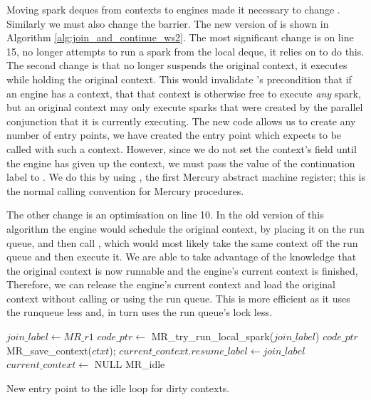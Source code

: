 Moving spark deques from contexts to engines made it necessary to change
\idle.
Similarly we must also change the \joinandcontinue barrier.
The new version of \joinandcontinue is shown in Algorithm
\ref{alg:join_and_continue_ws2}.
The most significant change is on line 15,
\joinandcontinue no longer attempts to run a spark from the local deque,
it relies on \idle to do this.
The second change is that \joinandcontinue no longer suspends the original
context, it executes \idle while holding the original context.
This would invalidate \idle's precondition that if an engine has a context,
that that context is otherwise free to execute \emph{any} spark,
but an original context may only execute sparks that were created by the
parallel conjunction that it is currently executing.
The new \idle code allows us to create any number of entry points,
we have created the \idleorigcontext entry point which expects to be called
with such a context.
However, since we do not set the context's  field until
the engine has given up the context,
we must pass the value of the continuation label to \idleorigcontext.
We do this by using , the first Mercury abstract machine
register;
this is the normal calling convention for Mercury procedures.

The other change is an optimisation on line 10.
In the old version of this algorithm the engine would schedule the original
context,
by placing it on the run queue,
and then call \idle,
which would most likely take the same context off the run queue and then
execute it.
We are able to take advantage of the knowledge that the original context is
now runnable and the engine's current context is finished,
Therefore, we can release the engine's current context and load the original
context without calling \idle or using the run queue.
This is more efficient as it uses the runqueue less and,
in turn uses the run queue's lock less.

\begin{algorithm}[tbp]
\begin{algorithmic}
        \State $join\_label \gets MR\_r1$
        \State $code\_ptr \gets$ MR\_try\_run\_local\_spark($join\_label$)
            \Goto $code\_ptr$
        \EndIf
        \State MR\_save\_context($ctxt$);
        \State $current\_context.resume\_label \gets join\_label$
        \State $current\_context \gets$ NULL
        \Goto MR\_idle
    \EndProcedure
\end{algorithmic}
\caption{New entry point to the idle loop for dirty contexts.}
\label{alg:idle_orig_context}
\end{algorithm}

